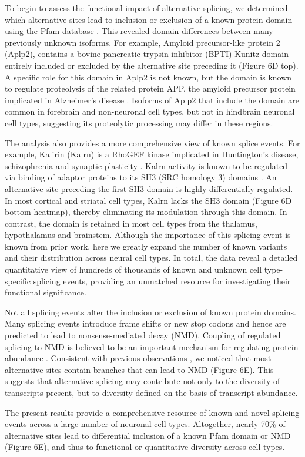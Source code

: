 To begin to assess the functional impact of alternative splicing, we determined which alternative sites lead to inclusion or exclusion of a known protein domain using the Pfam database \citep{Finn_2015}. This revealed domain differences between many previously unknown isoforms. For example, Amyloid precursor-like protein 2 (Aplp2), contains a bovine pancreatic trypsin inhibitor (BPTI) Kunitz domain entirely included or excluded by the alternative site preceding it (Figure 6D top). A specific role for this domain in Aplp2 is not known, but the domain is known to regulate proteolysis of the related protein APP, the amyloid precursor protein implicated in Alzheimer's disease \citep{Beckmann_2016}. Isoforms of Aplp2 that include the domain are common in forebrain and non-neuronal cell types, but not in hindbrain neuronal cell types, suggesting its proteolytic processing may differ in these regions.

The analysis also provides a more comprehensive view of known splice events. For example, Kalirin (Kalrn) is a RhoGEF kinase implicated in Huntington's disease, schizophrenia and synaptic plasticity \citep{Penzes_2008}. Kalrn activity is known to be regulated via binding of adaptor proteins to its SH3 (SRC homology 3) domains \citep{Schiller_2006}. An alternative site preceding the first SH3 domain is highly differentially regulated. In most cortical and striatal cell types, Kalrn lacks the SH3 domain (Figure 6D bottom heatmap), thereby eliminating its modulation through this domain. In contrast, the domain is retained in most cell types from the thalamus, hypothalamus and brainstem. Although the importance of this splicing event is known from prior work, here we greatly expand the number of known variants and their distribution across neural cell types. In total, the data reveal a detailed quantitative view of hundreds of thousands of known and unknown cell type-specific splicing events, providing an unmatched resource for investigating their functional significance.

Not all splicing events alter the inclusion or exclusion of known protein domains. Many splicing events introduce frame shifts or new stop codons and hence are predicted to lead to nonsense-mediated decay (NMD). Coupling of regulated splicing to NMD is believed to be an important mechanism for regulating protein abundance \cite{Lewis_2002}. Consistent with previous observations \citep{Yan_2015,Mauger_2017}, we noticed that most alternative sites contain branches that can lead to NMD (Figure 6E). This suggests that alternative splicing may contribute not only to the diversity of transcripts present, but to diversity defined on the basis of transcript abundance. 

The present results provide a comprehensive resource of known and novel splicing events across a large number of neuronal cell types. Altogether, nearly 70\% of alternative sites lead to differential inclusion of a known Pfam domain or NMD (Figure 6E), and thus to functional or quantitative diversity across cell types.
